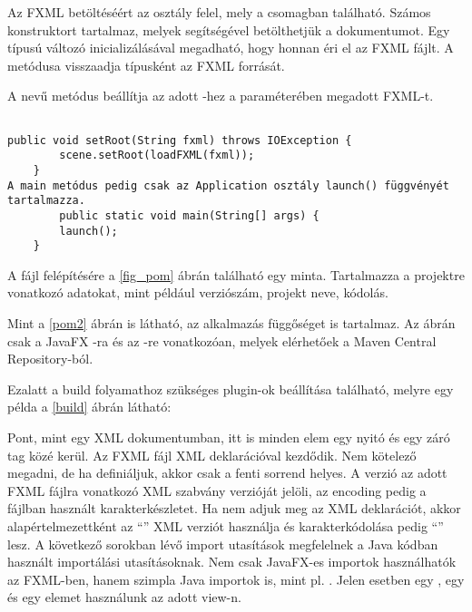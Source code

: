 Az FXML betöltéséért az  osztály felel, mely a  csomagban található.
Számos konstruktort tartalmaz, melyek segítségével betölthetjük a dokumentumot.
Egy  típusú változó inicializálásával megadható, hogy honnan éri el az FXML fájlt.
A  metódusa visszaadja  típusként az FXML forrását.

A  nevű metódus beállítja az adott -hez a paraméterében megadott FXML-t.

\begin{verbatim}

public void setRoot(String fxml) throws IOException {
        scene.setRoot(loadFXML(fxml));
    } 
A main metódus pedig csak az Application osztály launch() függvényét tartalmazza. 
        public static void main(String[] args) {
        launch();
    }
\end{verbatim}

A  fájl felépítésére a \ref{fig_pom} ábrán található egy minta.
Tartalmazza a projektre vonatkozó adatokat, mint például verziószám, projekt neve, kódolás. 
 

 
Mint a \ref{pom2} ábrán is látható, az alkalmazás függőséget is tartalmaz.
Az ábrán csak a JavaFX -ra és az -re vonatkozóan, melyek elérhetőek a Maven Central Repository-ból. 
  

Ezalatt a build folyamathoz szükséges plugin-ok beállítása található, melyre egy példa a \ref{build} ábrán látható: 


 

 
Pont, mint egy XML dokumentumban, itt is minden elem egy nyitó és egy záró tag közé kerül.
Az FXML fájl XML deklarációval kezdődik.
Nem kötelező megadni, de ha definiáljuk, akkor csak a fenti sorrend helyes.
A verzió az adott FXML fájlra vonatkozó XML szabvány verzióját jelöli, az encoding pedig a fájlban használt karakterkészletet.
Ha nem adjuk meg az XML deklarációt, akkor alapértelmezettként az “” XML verziót használja és karakterkódolása pedig “” lesz.
A következő sorokban lévő import utasítások megfelelnek a Java kódban használt importálási utasításoknak.
Nem csak JavaFX-es importok használhatók az FXML-ben, hanem szimpla Java importok is, mint pl. .
Jelen esetben egy , egy  és egy  elemet használunk az adott view-n. 
 

